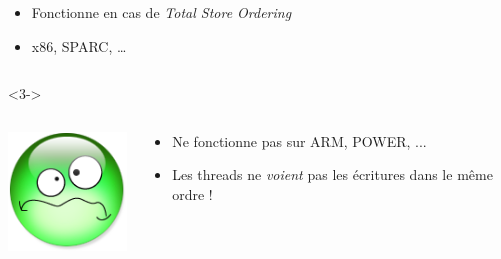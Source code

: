 \documentclass[xcolor={x11names,svgnames},x11names,svgnames]{beamer}
\begin{document}
\begin{frame}[fragile, label=tso_mp]
\begin{overlayarea}{\textwidth}{1cm}
\begin{onlyenv}
\begin{columns}[c]
        \begin{column}{.9\textwidth}
          \begin{itemize}        \small
          \item Fonctionne en cas de  \emph{Total Store Ordering}
          \item x86, SPARC, \dots
          \end{itemize}
        \end{column}
      \end{columns}
    \end{onlyenv}
    
    \begin{onlyenv}<3->  
      \begin{columns}[c]
        \begin{column}{.1\textwidth}
          \vspace{3mm}
          \includegraphics[width=\textwidth]{triste.png}
        \end{column}
        
        \begin{column}{.9\textwidth}
          \begin{itemize}        \small
          \item Ne fonctionne pas sur ARM, POWER, ...
          \item Les threads ne \emph{voient} pas les écritures dans le même ordre !
          \end{itemize}
        \end{column}
      \end{columns}  
    \end{onlyenv}
  \end{overlayarea}
  

\end{frame}
\end{document}
